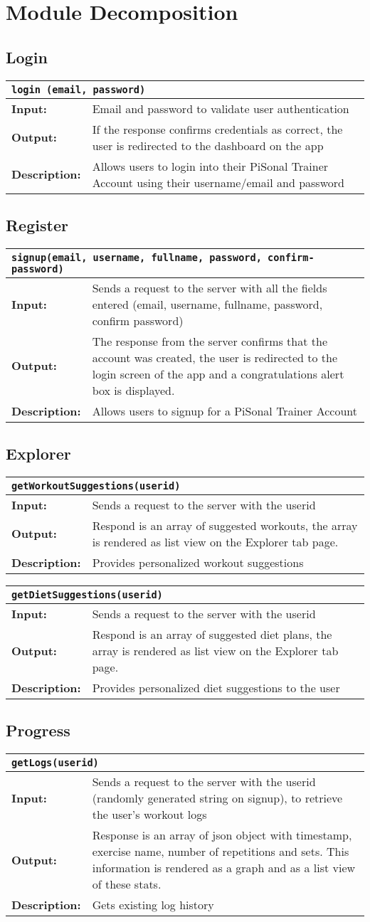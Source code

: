 \documentclass{article}
\newcommand{\name}[1]{\hline \multicolumn{2}{|l|}{\texttt{#1}} }
\newcommand{\inp}[1]{\hline \textbf{Input:} & #1}
\newcommand{\out}[1]{\hline \textbf{Output:} & #1}
\newcommand{\desc}[1]{\hline \textbf{Description:} & #1 }
\newcommand{\fcn}[4]{
    \begin{center}
    \begin{tabular}{|p{2cm} p{10cm}|}
    \hline
    \name{#1} \\
    \inp{#2} \\
    \out{#3} \\
    \desc{#4} \\
    \hline
    \end{tabular}
    \end{center}
}
\begin{document}
\section{Module Decomposition}
\subsection{Login}   
\fcn
{login (email, password)}
{Email and password to validate user authentication}
{If the response confirms credentials as correct, the user is redirected to the dashboard on the app}
{Allows users to login into their PiSonal Trainer Account using their username/email and password}
\medskip

\subsection{Register}  
\fcn
{signup(email, username, fullname, password, confirm-password)}
{Sends a request to the server with all the fields entered (email, username, fullname, password, confirm password)}
{The response from the server confirms that the account was created, the user is redirected to the login screen of the app and a congratulations alert box is displayed.}
{Allows users to signup for a PiSonal Trainer Account}

\medskip

\subsection{Explorer }  
\fcn
{getWorkoutSuggestions(userid)}
{Sends a request to the server with the userid}
{Respond is an array of suggested workouts, the array is rendered as list view on the Explorer tab page.}
{Provides personalized workout suggestions}

\medskip

\fcn
{getDietSuggestions(userid)}
{Sends a request to the server with the userid}
{Respond is an array of suggested diet plans, the array is rendered as list view on the Explorer tab page.}
{Provides personalized diet suggestions to the user}

\subsection{Progress}   
\fcn
{getLogs(userid)}
{Sends a request to the server with the userid (randomly generated string on signup), to retrieve the user’s workout logs}
{Response is an array of json object with timestamp, exercise name, number of repetitions and sets. This information is rendered as a graph and as a list view of these stats.}
{Gets existing log history}
\medskip
\end{document}
